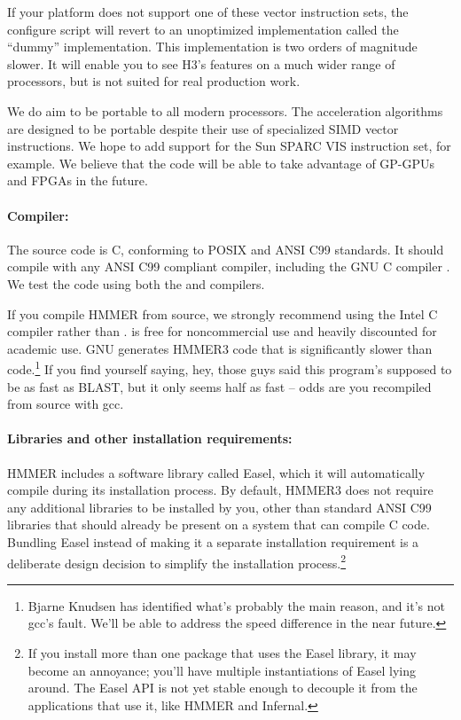 If your platform does not support one of these vector instruction
sets, the configure script will revert to an unoptimized
implementation called the ``dummy'' implementation. This
implementation is two orders of magnitude slower. It will enable you
to see H3's features on a much wider range of processors, but is not
suited for real production work.

We do aim to be portable to all modern processors. The acceleration
algorithms are designed to be portable despite their use of
specialized SIMD vector instructions. We hope to add support for the
Sun SPARC VIS instruction set, for example. We believe that the code
will be able to take advantage of GP-GPUs and FPGAs in the future.

\paragraph{Compiler:} The source code is C, conforming to POSIX and ANSI
C99 standards. It should compile with any ANSI C99 compliant compiler,
including the GNU C compiler . We test the code using both
the  and  compilers.

If you compile HMMER from source, we strongly recommend using the
Intel C compiler  rather than .  is free
for noncommercial use and heavily discounted for academic use.  GNU
 generates HMMER3 code that is significantly slower than
 code.\footnote{Bjarne Knudsen has identified what's
  probably the main reason, and it's not gcc's fault. We'll be able
  to address the speed difference in the near future.} If you find
yourself saying, hey, those guys said this program's supposed to be as
fast as BLAST, but it only seems half as fast -- odds are you
recompiled from source with gcc.


\paragraph{Libraries and other installation requirements:} HMMER includes
a software library called Easel, which it will automatically compile
during its installation process.  By default, HMMER3 does not require
any additional libraries to be installed by you, other than standard
ANSI C99 libraries that should already be present on a system that can
compile C code. Bundling Easel instead of making it a separate
installation requirement is a deliberate design decision to simplify
the installation process.\footnote{If you install more than one
  package that uses the Easel library, it may become an annoyance;
  you'll have multiple instantiations of Easel lying around. The Easel
  API is not yet stable enough to decouple it from the applications
  that use it, like HMMER and Infernal.}

